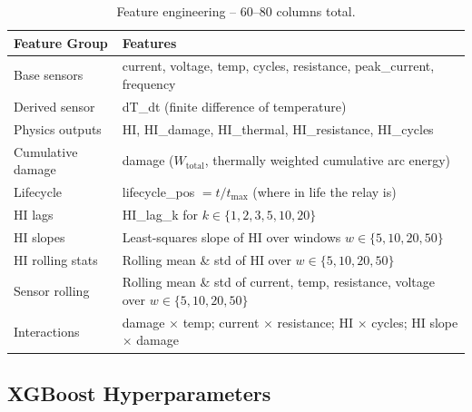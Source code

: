 \documentclass[12pt,a4paper]{article}
\begin{document}
\begin{table}[H]
\centering
\begin{tabularx}{\textwidth}{lX}
\toprule
\textbf{Feature Group} & \textbf{Features} \\
\midrule
Base sensors     & current, voltage, temp, cycles, resistance, peak\_current, frequency \\
Derived sensor   & dT\_dt (finite difference of temperature) \\
Physics outputs  & HI, HI\_damage, HI\_thermal, HI\_resistance, HI\_cycles \\
Cumulative damage & damage ($W_{\text{total}}$, thermally weighted cumulative arc energy) \\
Lifecycle        & lifecycle\_pos $= t / t_{\max}$ (where in life the relay is) \\
HI lags          & HI\_lag\_k for $k \in \{1,2,3,5,10,20\}$ \\
HI slopes        & Least-squares slope of HI over windows $w \in \{5,10,20,50\}$ \\
HI rolling stats & Rolling mean \& std of HI over $w \in \{5,10,20,50\}$ \\
Sensor rolling   & Rolling mean \& std of current, temp, resistance, voltage over $w \in \{5,10,20,50\}$ \\
Interactions     & damage $\times$ temp; current $\times$ resistance; HI $\times$ cycles; HI slope $\times$ damage \\
\bottomrule
\end{tabularx}
\caption{Feature engineering -- 60--80 columns total.}
\end{table}

\subsection{XGBoost Hyperparameters}
\end{document}
